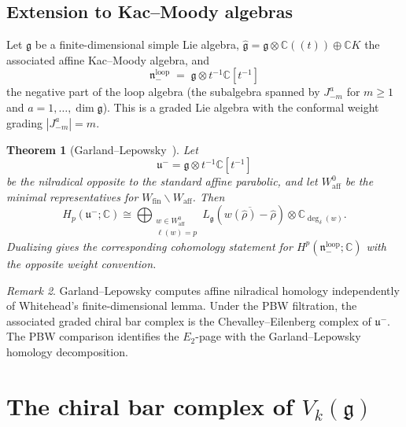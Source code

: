 \documentclass[11pt]{article}
\theoremstyle{plain}
\newtheorem{theorem}{Theorem}[section]
\theoremstyle{definition}
\theoremstyle{remark}
\newtheorem{remark}[theorem]{Remark}
\newcommand{\fg}{\mathfrak{g}}
\newcommand{\fn}{\mathfrak{n}}
\newcommand{\ghat}{\widehat{\fg}}
\numberwithin{equation}{section}
\begin{document}
\subsection{Extension to Kac--Moody algebras}

Let $\fg$ be a finite-dimensional simple Lie algebra,
$\ghat = \fg \otimes \mathbb{C}((t)) \oplus \mathbb{C} K$
the associated affine Kac--Moody algebra, and
\begin{equation}\label{eq:n-minus-loop}
\fn_-^{\mathrm{loop}}
\;=\; \fg \otimes t^{-1}\mathbb{C}[t^{-1}]
\end{equation}
the negative part of the loop algebra (the subalgebra spanned by
$J^a_{-m}$ for $m \geq 1$ and $a = 1, \ldots, \dim\fg$).
This is a graded Lie algebra with the conformal weight grading
$|J^a_{-m}| = m$.

\begin{theorem}[Garland--Lepowsky~\cite{GL76}]
\label{thm:garland-lepowsky}
Let
\[
\mathfrak u^-=\fg\otimes t^{-1}\mathbb C[t^{-1}]
\]
be the nilradical opposite to the standard affine parabolic, and let
$W_{\mathrm{aff}}^0$ be the minimal representatives for
$W_{\mathrm{fin}}\backslash W_{\mathrm{aff}}$. Then
\[
H_p(\mathfrak u^-;\mathbb C)
\cong
\bigoplus_{\substack{w\in W_{\mathrm{aff}}^0\\ \ell(w)=p}}
L_{\fg}\!\left(\overline{w(\widehat\rho)-\widehat\rho}\right)
\otimes \mathbb C_{\deg_\delta(w)}.
\]
Dualizing gives the corresponding cohomology statement for
$H^p(\fn_-^{\mathrm{loop}};\mathbb C)$ with the opposite weight
convention.
\end{theorem}

\begin{remark}\label{rem:GL-mechanism}
Garland--Lepowsky computes affine nilradical homology independently of
Whitehead's finite-dimensional lemma. Under the PBW filtration, the
associated graded chiral bar complex is the Chevalley--Eilenberg
complex of \(\mathfrak u^-\). The PBW comparison identifies the
\(E_2\)-page with the Garland--Lepowsky homology decomposition.
\end{remark}


\section{The chiral bar complex of \texorpdfstring{$V_k(\fg)$}{Vk(g)}}
\label{sec:chiral-bar}
\end{document}
